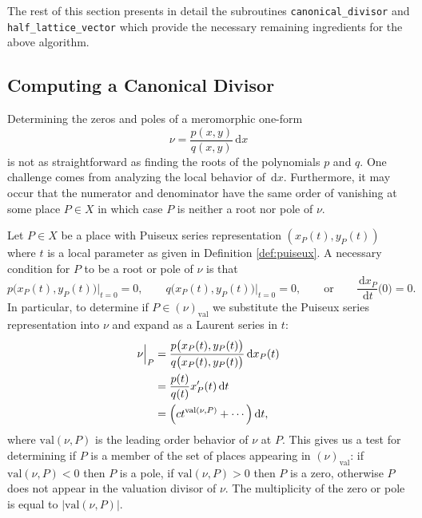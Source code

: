 \documentclass[12pt]{article}
\theoremstyle{definition}
\newcommand{\dx}{\,\mathrm{d}x}
\newcommand{\dt}{\,\mathrm{d}t}
\begin{document}
The rest of this section presents in detail the subroutines
\verb=canonical_divisor= and \verb=half_lattice_vector= which provide
the necessary remaining ingredients for the above algorithm.



\subsection{Computing a Canonical Divisor}\label{sec:canonical}



Determining the zeros and poles of a meromorphic one-form
\begin{equation} \label{eqn:meromorphic-one-form}
\nu = \frac{p(x,y)}{q(x,y)}\dx
\end{equation}
is not as straightforward as finding the roots of the polynomials $p$
and $q$. One challenge comes from analyzing the local behavior of
$\dx$. Furthermore, it may occur that the numerator and denominator have
the same order of vanishing at some place $P \in X$ in which case $P$ is
neither a root nor pole of $\nu$.

Let $P \in X$ be a place with Puiseux series representation $(x_P(t),
y_P(t))$ where $t$ is a local parameter as given in Definition
\ref{def:puiseux}. A necessary condition for $P$ to be a root or pole of
$\nu$ is that
\begin{equation}
  p\big(x_P(t), y_P(t)\big) \Big|_{t=0} \! = 0,
  \qquad
  q\big(x_P(t), y_P(t)\big) \Big|_{t=0} \! = 0,
  \qquad \text{or} \qquad
  \frac{\dx_P}{\dt}\big(0\big) = 0.
\end{equation}
In particular, to determine if $P \in (\nu)_\text{val}$ we substitute
the Puiseux series representation into $\nu$ and expand as a Laurent
series in $t$:
\begin{align} \label{eqn:localization}
\nu \Big|_P
&=
\frac{p\big(x_P(t),y_P(t)\big)}{q\big(x_P(t),y_P(t)\big)} \dx_P(t) \notag \\
&=
\frac{p(t)}{q(t)} x_P'(t) \dt \notag \\
&=
\Big( c t^{\text{val}(\nu,P)} + \cdots \Big) \dt,
\end{align}
where $\text{val}(\nu,P)$ is the leading order behavior of $\nu$ at
$P$. This gives us a test for determining if $P$ is a member of the set
of places appearing in $(\nu)_\text{val}$: if $\text{val}(\nu,P) < 0$
then $P$ is a pole, if $\text{val}(\nu,P) > 0$ then $P$ is a zero,
otherwise $P$ does not appear in the valuation divisor of $\nu$. The
multiplicity of the zero or pole is equal to $|\text{val}(\nu,P)|$.
\end{document}

